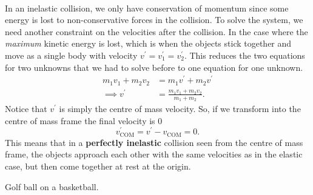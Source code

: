 \documentclass[../newtonian_mechanics.tex]{subfiles}
\begin{document}
        \paragraph{}
        In an inelastic collision, we only have conservation of momentum since some energy is lost to non-conservative forces in the collision.
        To solve the system, we need another constraint on the velocities after the collision.
        In the case where the \textit{maximum} kinetic energy is lost, which is when the objects stick together and move as a single body with velocity $v^\prime=v_1^\prime=v_2^\prime$.
        This reduces the two equations for two unknowns that we had to solve before to one equation for one unknown.
        \begin{align}
            m_1v_1+m_2v_2&=m_1v^\prime+m_2v^\prime\\
            \implies v^\prime&=\frac{m_1v_1+m_2v_2}{m_1+m_2}.
        \end{align}
        Notice that $v^\prime$ is simply the centre of mass velocity.
        So, if we transform into the centre of mass frame the final velocity is 0
        \begin{equation}
            v_\text{COM}^\prime=v^\prime-v_\text{COM}=0.
        \end{equation}
        This means that in a \textbf{perfectly inelastic} collision seen from the centre of mass frame, the objects approach each other with the same velocities as in the elastic case, but then come together at rest at the origin.
        \begin{example}
            Golf ball on a basketball.
        \end{example}
\end{document}
